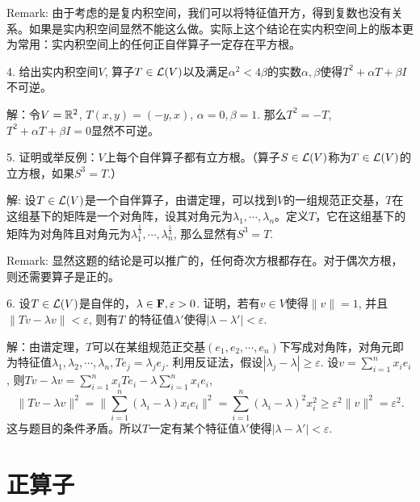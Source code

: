 \documentclass[hyperref,]{ctexart}
\begin{document}
\smallskip

\noindent{} Remark:
由于考虑的是复内积空间，我们可以将特征值开方，得到复数也没有关系。如果是实内积空间显然不能这么做。实际上这个结论在实内积空间上的版本更为常用：实内积空间上的任何正自伴算子一定存在平方根。

\bigskip

\noindent{} 4. 给出实内积空间\(V\),
算子\(T\in\mathcal{L}(V)\)以及满足\(\alpha^2<4\beta\)的实数\(\alpha,\beta\)使得\(T^2+\alpha T+\beta I\)不可逆。

\smallskip

\noindent{} 解：令\(V=\mathbb{R}^2\), \(T(x,y)=(-y,x)\), \(\alpha=0,\beta=1\).
那么\(T^2=-T\), \(T^2+\alpha T+\beta I=0\)显然不可逆。

\noindent{} 5.
证明或举反例：\(V\)上每个自伴算子都有立方根。（算子\(S\in\mathcal{L}(V)\)称为\(T\in\mathcal{L}(V)\)的立方根，如果\(S^3=T\).）

\smallskip

\noindent{} 解:
设\(T\in\mathcal{L}(V)\)是一个自伴算子，由谱定理，可以找到\(V\)的一组规范正交基，\(T\)在这组基下的矩阵是一个对角阵，设其对角元为\(\lambda_1,\cdots,\lambda_n\)。定义\(T\)，它在这组基下的矩阵为对角阵且对角元为\(\lambda_1^{\frac13},\cdots,\lambda_n^{\frac13}\),
那么显然有\(S^3=T\).

\smallskip

\noindent{} Remark:
显然这题的结论是可以推广的，任何奇次方根都存在。对于偶次方根，则还需要算子是正的。

\bigskip

\noindent{} 6.
设\(T\in\mathcal{L}(V)\)是自伴的，\(\lambda\in\mathbf{F},\varepsilon>0\).
证明，若有\(v\in V\)使得\(\|v\|=1\),
并且\(\|Tv-\lambda v\|<\varepsilon\), 则有\(T\)
的特征值\(\lambda'\)使得\(|\lambda-\lambda'|<\varepsilon\).

\smallskip

\noindent{}
解：由谱定理，\(T\)可以在某组规范正交基\((e_1,e_2,\cdots,e_n)\)下写成对角阵，对角元即为特征值\(\lambda_1,\lambda_2,\cdots,\lambda_n, Te_j=\lambda_j e_j\).
利用反证法，假设\(|\lambda_j-\lambda|\ge\varepsilon\).
设\(v=\sum_{i=1}^nx_ie_i\),
则\(Tv-\lambda v=\sum_{i=1}^nx_i Te_i-\lambda\sum_{i=1}^nx_ie_i\),
\[\|Tv-\lambda v\|^2=\|\sum_{i=1}^n(\lambda_i-\lambda)x_ie_i\|^2=\sum_{i=1}^n(\lambda_i-\lambda)^2x_i^2\ge\varepsilon^2\|v\|^2=\varepsilon^2.\]
这与题目的条件矛盾。所以\(T\)一定有某个特征值\(\lambda'\)使得\(|\lambda-\lambda'|<\varepsilon\).

\bigskip

\section{正算子}\label{ux6b63ux7b97ux5b50}
\end{document}
